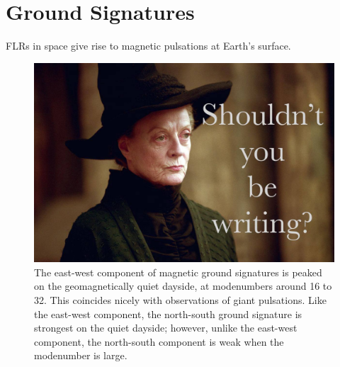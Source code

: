 \section{Ground Signatures}

FLRs in space give rise to magnetic pulsations at Earth's surface. 




\begin{figure}[!htb]
    \centering
    \includegraphics[width=\textwidth]{figures/placeholder.jpg}
    \caption[Dayside Ground Magnetic Fields]{
      The east-west component of magnetic ground signatures is peaked on the geomagnetically quiet dayside, at modenumbers around 16 to 32. This coincides nicely with observations of giant pulsations. Like the east-west component, the north-south ground signature is strongest on the quiet dayside; however, unlike the east-west component, the north-south component is weak when the modenumber is large. 
    }
    \label{fig_ground_2_4_5}
\end{figure}

